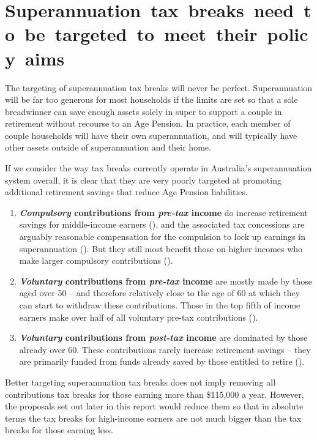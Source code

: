 \section{\mbox{Superannuation tax breaks need to be targeted to meet their policy aims}}\label{sec:SUPER-3-7}
The targeting of superannuation tax breaks will never be perfect. Superannuation will be far too generous for most households if the limits are set so that a sole breadwinner can save enough assets solely in super to support a couple in retirement without recourse to an Age Pension. In practice, each member of couple households will have their own superannuation, and will typically have other assets outside of superannuation and their home.

If we consider the way tax breaks currently operate in Australia’s superannuation system overall, it is clear that they are very poorly targeted at promoting additional retirement savings that reduce Age Pension liabilities.

\newcommand{\outerbf}[1]{\textbf{#1}}
\newcommand{\emphbf}[1]{\textit{#1}}
\begin{enumerate}
\item \outerbf{\emphbf{Compulsory} contributions from \emphbf{pre-tax} income} do increase retirement savings for middle-income earners (), and the associated tax concessions are arguably reasonable compensation for the compulsion to lock up earnings in superannuation (). But they still most benefit those on higher incomes who make larger compulsory contributions ().
\item \outerbf{\emphbf{Voluntary} contributions from \emphbf{pre-tax} income} are mostly made by those aged over 50 – and therefore relatively close to the age of 60 at which they can start to withdraw these contributions. Those in the top fifth of income earners make over half of all voluntary pre-tax contributions (). 
\item \outerbf{\emphbf{Voluntary} contributions from \emphbf{post-tax} income} are dominated by those already over 60. These contributions rarely increase retirement savings – they are primarily funded from funds already saved by those entitled to retire (). 
\end{enumerate}


Better targeting superannuation tax breaks does not imply removing all contributions tax breaks for those earning more than \$115,000 a year. However, the proposals set out later in this report would reduce them so that in absolute terms the tax breaks for high-income earners are not much bigger than the tax breaks for those earning less. 

